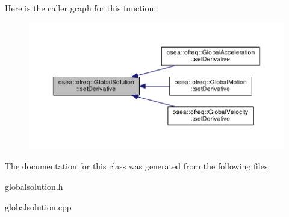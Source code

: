 Here is the caller graph for this function\-:
\nopagebreak
\begin{figure}[H]
\begin{center}
\leavevmode
\includegraphics[width=350pt]{classosea_1_1ofreq_1_1_global_solution_a537163391f1f55d073720b20f69acfa5_icgraph}
\end{center}
\end{figure}




The documentation for this class was generated from the following files\-:\begin{DoxyCompactItemize}
\item 
globalsolution.\-h\item 
globalsolution.\-cpp\end{DoxyCompactItemize}
